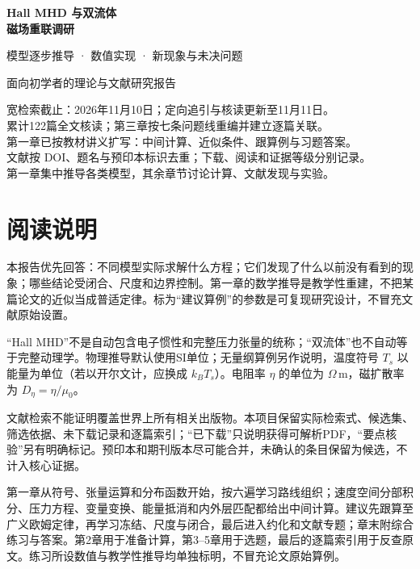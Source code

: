 \documentclass[UTF8,a4paper,11pt,openany,fontset=fandol]{ctexbook}
\begin{document}
\frontmatter
\begin{titlepage}
\vspace*{20mm}
{\sffamily\Huge\bfseries\color{ink}Hall MHD 与双流体\\[8pt]磁场重联调研\par}
\vspace{12mm}
{\sffamily\Large 模型逐步推导 · 数值实现 · 新现象与未决问题\par}
\vspace{14mm}
{\large 面向初学者的理论与文献研究报告\par}
\vfill
宽检索截止：2026年11月10日；定向追引与核读更新至11月11日。\\[5pt]
累计122篇全文核读；第三章按七条问题线重编并建立逐篇关联。\\[5pt]
第一章已按教材讲义扩写：中间计算、近似条件、跟算例与习题答案。\\[5pt]
文献按 DOI、题名与预印本标识去重；下载、阅读和证据等级分别记录。\\[5pt]
第一章集中推导各类模型，其余章节讨论计算、文献发现与实验。\\[8pt]

\end{titlepage}
\chapter*{阅读说明}
本报告优先回答：不同模型实际求解什么方程；它们发现了什么以前没有看到的现象；哪些结论受闭合、尺度和边界控制。第一章的数学推导是教学性重建，不把某篇论文的近似当成普适定律。标为“建议算例”的参数是可复现研究设计，不冒充文献原始设置。

“Hall MHD”不是自动包含电子惯性和完整压力张量的统称；“双流体”也不自动等于完整动理学。物理推导默认使用SI单位；无量纲算例另作说明，温度符号 $T_s$ 以能量为单位（若以开尔文计，应换成 $k_BT_s$）。电阻率 $\eta$ 的单位为 $\Omega\,\mathrm m$，磁扩散率为 $D_\eta=\eta/\mu_0$。

文献检索不能证明覆盖世界上所有相关出版物。本项目保留实际检索式、候选集、筛选依据、未下载记录和逐篇索引；“已下载”只说明获得可解析PDF，“要点核验”另有明确标记。预印本和期刊版本尽可能合并，未确认的条目保留为候选，不计入核心证据。

第一章从符号、张量运算和分布函数开始，按六遍学习路线组织；速度空间分部积分、压力方程、变量变换、能量抵消和内外层匹配都给出中间计算。建议先跟算至广义欧姆定律，再学习冻结、尺度与闭合，最后进入约化和文献专题；章末附综合练习与答案。第2章用于准备计算，第3--5章用于选题，最后的逐篇索引用于反查原文。练习所设数值与教学性推导均单独标明，不冒充论文原始算例。
\tableofcontents
\mainmatter














\backmatter


\end{document}
